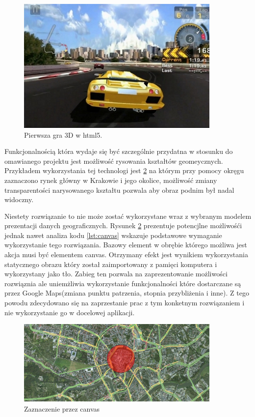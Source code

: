 \begin{figure}[H]
  \centering
    \includegraphics[width=100mm]{ge/html5_3d.jpg}
  \caption{Pierwsza gra 3D w html5.}
  \label{fig:html3d}
\end{figure}

Funkcjonalnością która wydaje się być szczególnie przydatna w stosunku do omawianego projektu jest możliwość rysowania kształtów geomeycznych. Przykładem wykorzystania tej technologi jest \ref{fig:canvas1} na którym przy pomocy okręgu zaznaczono rynek główny w Krakowie i jego okolice, możliwość zmiany transparentości narysowanego kształtu pozwala aby obraz podnim był nadal widoczny.

Niestety rozwiązanie to nie może zostać wykorzystane wraz z wybranym modelem prezentacji danych geograficznych. Rysunek \ref{fig:canvas1} prezentuje potencjlne możliwośći jednak nawet analiza kodu \ref{lst:canvas} wskazuje podstawowe wymaganie wykorzystanie tego rozwiązania. Bazowy element w obrębie którego możliwa jest akcja musi być elementem canvas.
Otrzymany efekt jest wynikiem wykorzystania statycznego obrazu który został zaimportowany z pamięci komputera i wykorzystany jako tło. Zabieg ten pozwala na zaprezentowanie możliwości rozwiąznia ale uniemżliwia wykorzystanie funkcjonalności które dostarczane są przez Google Maps(zmiana punktu patrzenia, stopnia przybliżenia i inne). Z tego powodu zdecydowano się na zaprzestanie prac z tym konketnym rozwiązaniem i nie wykorzystanie go w docelowej aplikacji.

  \begin{figure}[H]
  \centering
    \includegraphics[width=100mm]{ge/canvas1.jpg}
  \caption{Zaznaczenie przez canvas}
  \label{fig:canvas1}
\end{figure}

